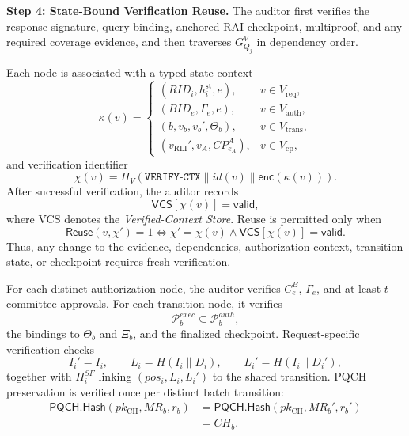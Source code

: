 \documentclass[lettersize,journal]{IEEEtran}
\begin{document}
\medskip
\noindent\textbf{Step 4: State-Bound Verification Reuse.}
The auditor first verifies the response signature, query binding,
anchored RAI checkpoint, multiproof, and any required coverage
evidence, and then traverses $G_{Q_j}^{V}$ in dependency order.

Each node is associated with a typed state context
\begin{equation}
\kappa(v)=
\begin{cases}
(RID_i,h_i^{\mathrm{st}},e),
&v\in V_{\mathrm{req}},\\
(BID_e,\Gamma_e,e),
&v\in V_{\mathrm{auth}},\\
(b,v_b,v_b',\Theta_b),
&v\in V_{\mathrm{trans}},\\
(v_{\mathrm{RLI}}',v_A,CP_{e_A}^A),
&v\in V_{\mathrm{cp}},
\end{cases}
\end{equation}
and verification identifier
\begin{equation}
\chi(v)=
H_V(
\texttt{VERIFY-CTX}\parallel
id(v)\parallel\mathsf{enc}(\kappa(v))).
\end{equation}
After successful verification, the auditor records
\begin{equation}
\mathsf{VCS}[\chi(v)]=\mathsf{valid},
\end{equation}
where VCS denotes the \emph{Verified-Context Store}. Reuse is permitted
only when
\begin{equation}
\mathsf{Reuse}(v,\chi')
=1
\Longleftrightarrow
\chi'=\chi(v)
\land
\mathsf{VCS}[\chi(v)]=\mathsf{valid}.
\label{eq:saver_reuse}
\end{equation}
Thus, any change to the evidence, dependencies, authorization context,
transition state, or checkpoint requires fresh verification.

For each distinct authorization node, the auditor verifies $C_e^B$,
$\Gamma_e$, and at least $t$ committee approvals. For each transition
node, it verifies
\begin{equation}
\mathcal{P}_b^{exec}\subseteq\mathcal{P}_b^{auth},
\end{equation}
the bindings to $\Theta_b$ and $\Xi_b$, and the finalized checkpoint.
Request-specific verification checks
\begin{equation}
I_i'=I_i,\qquad
L_i=H(I_i\parallel D_i),\qquad
L_i'=H(I_i\parallel D_i'),
\end{equation}
together with $\Pi_i^{SF}$ linking
$(pos_i,L_i,L_i')$ to the shared transition. PQCH preservation is
verified once per distinct batch transition:
\begin{equation}
\begin{aligned}
\mathsf{PQCH.Hash}(pk_{\mathrm{CH}},MR_b,r_b)
&=
\mathsf{PQCH.Hash}(pk_{\mathrm{CH}},MR_b',r_b')\\
&=CH_b.
\end{aligned}
\end{equation}
\end{document}
